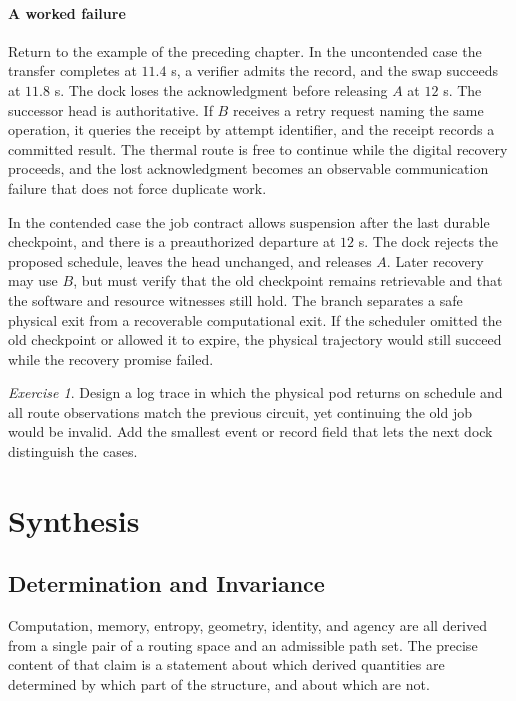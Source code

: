 \documentclass[11pt,openany]{book}
\theoremstyle{plain}
\theoremstyle{definition}
\theoremstyle{remark}
\newtheorem{exercise}[theorem]{Exercise}
\begin{document}
\subsection*{A worked failure}

Return to the example of the preceding chapter. In the uncontended case the transfer completes at $11.4$ s, a verifier admits the record, and the swap succeeds at $11.8$ s. The dock loses the acknowledgment before releasing $A$ at $12$ s. The successor head is authoritative. If $B$ receives a retry request naming the same operation, it queries the receipt by attempt identifier, and the receipt records a committed result. The thermal route is free to continue while the digital recovery proceeds, and the lost acknowledgment becomes an observable communication failure that does not force duplicate work.

In the contended case the job contract allows suspension after the last durable checkpoint, and there is a preauthorized departure at $12$ s. The dock rejects the proposed schedule, leaves the head unchanged, and releases $A$. Later recovery may use $B$, but must verify that the old checkpoint remains retrievable and that the software and resource witnesses still hold. The branch separates a safe physical exit from a recoverable computational exit. If the scheduler omitted the old checkpoint or allowed it to expire, the physical trajectory would still succeed while the recovery promise failed.

\begin{exercise}
Design a log trace in which the physical pod returns on schedule and all route observations match the previous circuit, yet continuing the old job would be invalid. Add the smallest event or record field that lets the next dock distinguish the cases.
\end{exercise}
\part{Synthesis}

\chapter{Determination and Invariance}
\label{ch:determination}

Computation, memory, entropy, geometry, identity, and agency are all derived from a single pair of a routing space and an admissible path set. The precise content of that claim is a statement about which derived quantities are determined by which part of the structure, and about which are not.
\end{document}

